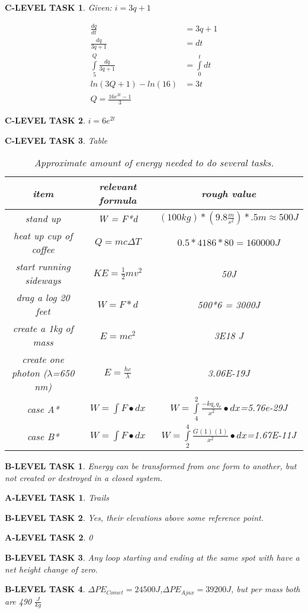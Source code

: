 \documentclass{book}
\numberwithin{equation}{section}
\newtheorem{alevel}{A-LEVEL TASK}
\newtheorem{blevel}{B-LEVEL TASK}
\newtheorem{clevel}{C-LEVEL TASK}
\theoremstyle{definition}
\begin{document}
\begin{clevel} Given: $i=3q+1$ \par
\begin{align*}
\frac{dq}{dt}&=3q+1\\
\frac{dq}{3q+1}&=dt\\
\int\limits_5^Q{\frac{dq}{3q+1}}&=\int\limits_0^t{dt}\\
ln(3Q+1)-ln(16)&=3t\\
Q=\frac{16e^{3t}-1}{3}
\end{align*}
\end{clevel}
\begin{clevel}$i=6e^{2t}$\end{clevel}

\begin{clevel} Table\par
\begin{table}[H]
\begin{center}
\begin{tabular}{|c| c| c|} \hline
item & relevant formula	& rough value \\ \hline
stand up	& W = F*d	& $(100kg)*(9.8 \frac{m}{s^2})*.5 m \approx 500J$\\ \hline
heat up cup of coffee &$Q=mc\Delta T$	& $0.5*4186*80=160000J$\\ \hline
start running sideways	&$KE=\frac{1}{2}mv^2$	&50J\\ \hline
drag a log 20 feet	&$W=F*d$	&500*6 = 3000J\\ \hline
create a 1kg of mass	&$E=mc^2$	&3E18 J\\ \hline
create one photon ($\lambda$=650 nm)	&$E=\frac{hc}{\lambda}$	&3.06E-19J	\\ \hline
case A*			&$W=\int{F\bullet dx}$	&$W=\int\limits_4^2{\frac{-kq_eq_e}{x^2}\bullet dx}$=5.76e-29J\\ \hline
case B*			&$W=\int{F\bullet dx}$	&$W=\int\limits_2^4{\frac{G(1)(1)}{x^2}\bullet dx}$=1.67E-11J\\ \hline
\end{tabular}
\caption{Approximate amount of energy needed to do several tasks.}
\end{center}
\end{table}
\end{clevel}

\begin{blevel}Energy can be transformed from one form to another, but not created or destroyed in a closed system.\end{blevel}
\begin{alevel}Trails\end{alevel}
\begin{blevel}Yes, their elevations above some reference point.\end{blevel}
\begin{alevel}0\end{alevel}
\begin{blevel}Any loop starting and ending at the same spot with have a net height change of zero.\end{blevel}
\begin{blevel}$\Delta PE_{Comet}=24500J$,$\Delta PE_{Ajax}=39200J$, but per mass both are 490 $\frac{J}{kg}$\end{blevel}
\end{document}
